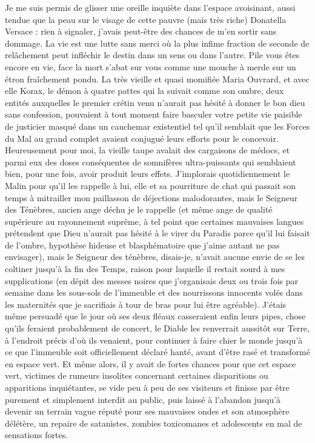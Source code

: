 \label{rat:19}%
Je me suis permis de glisser une oreille inquiète dans l’espace avoisinant, aussi tendue que la peau sur le visage de cette pauvre (mais très riche) Donatella Versace : rien à signaler, j’avais peut-être des chances de m’en sortir sans dommage. La vie est une lutte sans merci où la plus infime fraction de seconde de relâchement peut infléchir le destin dans un sens ou dans l’autre. Pile vous êtes encore en vie, face la mort s’abat sur vous comme une mouche à merde sur un étron fraîchement pondu. La très vieille et quasi momifiée Maria Ouvrard, et avec elle Korax, le démon à quatre pattes qui la suivait comme son ombre, deux entités auxquelles le premier crétin venu n’aurait pas hésité à donner le bon dieu sans confession, pouvaient à tout moment faire basculer votre petite vie paisible de justicier masqué dans un cauchemar existentiel tel qu’il semblait que les Forces du Mal au grand complet avaient conjugué leurs efforts pour le concevoir. Heureusement pour moi, la vieille taupe avalait des cargaisons de médocs, et parmi eux des doses conséquentes de somnifères ultra-puissants qui semblaient bien, pour une fois, avoir produit leurs effets. J’implorais quotidiennement le Malin pour qu’il les rappelle à lui, elle et sa pourriture de chat qui passait  son temps à mitrailler mon paillasson de déjections malodorantes, mais le Seigneur des Ténèbres, ancien ange déchu je le rappelle (et même ange de qualité supérieure au rayonnement suprême, à tel point que certaines mauvaises langues prétendent que Dieu n’aurait pas hésité à le virer du Paradis parce qu’il lui faisait de l’ombre, hypothèse hideuse et blasphématoire que j’aime autant ne pas envisager), mais le Seigneur des ténèbres, disais-je, n’avait aucune envie de se les coltiner jusqu’à la fin des Temps, raison pour laquelle il restait sourd à mes supplications (en dépit des messes noires que j’organisais deux ou trois fois par semaine dans les sous-sols de l’immeuble et des nourrissons innocents volés dans les maternités que je sacrifiais à tour de bras pour lui être agréable). J’étais même persuadé que le jour où ses deux fléaux casseraient enfin leurs pipes, chose qu’ils feraient probablement de concert, le Diable les renverrait aussitôt sur Terre, à l’endroit précis d’où ils venaient, pour continuer à faire chier le monde jusqu’à ce que l’immeuble soit officiellement déclaré hanté, avant d’être rasé et transformé en espace vert. Et même alors, il y avait de fortes chances pour que cet espace vert, victimes de rumeurs insolites concernant certaines disparitions ou apparitions inquiétantes, se vide peu à peu de ses visiteurs et finisse par être purement et simplement interdit au public, puis laissé à l’abandon jusqu’à devenir un terrain vague réputé pour ses mauvaises ondes et son atmosphère délétère, un repaire de satanistes, zombies toxicomanes et adolescents en mal de sensations fortes. 

